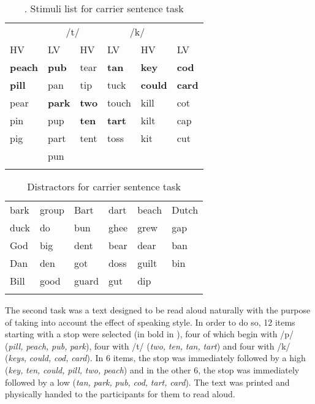 \documentclass[output=paper]{langsci/langscibook}
\begin{document}
\begin{table}
\caption{\label{tab:monje:2}. Stimuli list for carrier sentence task}


\begin{tabularx}{.66\textwidth}{X@{}l X@{}l X@{}l}
\lsptoprule

\multicolumn{2}{c}{ /p/} & \multicolumn{2}{c}{ /t/} & \multicolumn{2}{c}{ /k/}\\
 HV & LV & HV & LV & HV & LV\\
 \midrule 
 \textbf{peach} & \textbf{pub} & tear & \textbf{tan} & \textbf{key} & \textbf{cod}\\
 \textbf{pill} & pan & tip & tuck & \textbf{could} & \textbf{card}\\
 pear & \textbf{park} & \textbf{two} & touch & kill & cot\\
 pin & pup & \textbf{ten} & \textbf{tart} & kilt & cap\\
 pig & part & tent & toss & kit & cut\\
\multicolumn{1}{c}{} & pun & \multicolumn{4}{c}{}\\ 
\lspbottomrule
\end{tabularx}

\end{table}


\begin{table}
\caption{\label{tab:monje:3} Distractors for carrier sentence task}

\begin{tabularx}{\textwidth}{XXXXXX}
\lsptoprule 
 bark & group & Bart & dart & beach & Dutch\\
 duck & do & bun & ghee & grew & gap\\
 God & big & dent & bear & dear & ban\\
 Dan & den & got & doss & guilt & bin\\
 Bill & good & guard & gut & dip & \\
\lspbottomrule
\end{tabularx}
\end{table}


   The second task was a text designed to be read aloud naturally with the purpose of taking into account the effect of speaking style. In order to do so, 12 items starting with a  stop were selected (in bold in ), four of which begin with /p/ (\textit{pill,} \textit{peach,} \textit{pub,} \textit{park}), four with /t/ (\textit{two,} \textit{ten,} \textit{tan,} \textit{tart}) and four with /k/ (\textit{keys,} \textit{could,} \textit{cod,} \textit{card}). In 6 items, the stop was immediately followed by a high  (\textit{key,} \textit{ten,} \textit{could,} \textit{pill,} \textit{two,} \textit{peach}) and in the other 6, the stop was immediately followed by a low  (\textit{tan,} \textit{park,} \textit{pub,} \textit{cod,} \textit{tart,} \textit{card}). The text was printed and physically handed to the participants for them to read aloud. 
\end{document}
